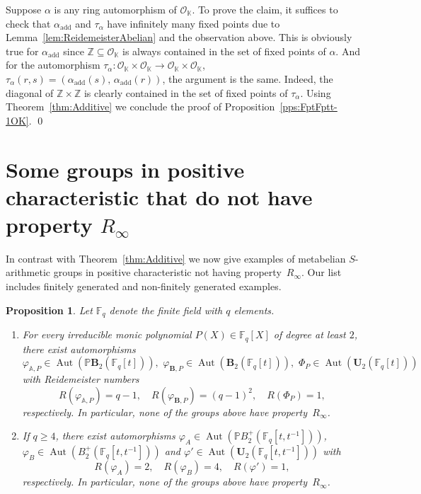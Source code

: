\documentclass[a4paper,11pt]{amsart}
\numberwithin{equation}{section}
\theoremstyle{plain}
\newtheorem{pps}[thm]{Proposition}
\theoremstyle{definition}
\newcommand{\Z}{\mathbb{Z}}
\newcommand{\K}{\mathbb{K}}
\newcommand{\F}{\mathbb{F}}
\newcommand{\addi}[1]{#1_{\text{add}}} %
\newcommand{\ri}{\mathcal{O}}
\newcommand{\mbU}{\mathbf{U}} %
\newcommand{\mbB}{\mathbf{B}} %
\newcommand{\PB}{\mathbb{P}\mathbf{B}} %
\newcommand{\PBplus}{\mathbb{P}B^{+}} %
\newcommand{\phee}{\varphi} %
\newcommand{\Ri}{R_{\infty}} %
\DeclareMathOperator{\Aut}{Aut}
\begin{document}
Suppose $\alpha$ is any ring automorphism of $\ri_\K$. To prove the claim, it suffices to check that $\addi{\alpha}$ and $\tau_\alpha$ have infinitely many fixed points due to Lemma~\ref{lem:ReidemeisterAbelian} and the observation above. This is obviously true for $\addi{\alpha}$ since $\Z \subseteq \ri_\K$ is always contained in the set of fixed points of $\alpha$. And for the automorphism $\tau_\alpha : \ri_\K \times \ri_\K \to \ri_\K \times \ri_\K$, $\tau_\alpha(r,s) = (\addi{\alpha}(s), \, \addi{\alpha}(r))$, the argument is the same. Indeed, the diagonal of $\Z \times \Z$ is clearly contained in the set of fixed points of $\tau_\alpha$. Using Theorem~\ref{thm:Additive} we conclude the proof of Proposition~\ref{pps:FptFptt-1OK}. \qed

\section{Some groups in positive characteristic that do not have property \texorpdfstring{$\Ri$}{R infinity}} \label{sec:newexampleswithoutRinfty}

In contrast with Theorem~\ref{thm:Additive} we now give examples of metabelian $S$-arithmetic groups in positive characteristic not having property~$\Ri$. Our list includes finitely generated and non-finitely generated examples.

\begin{pps}\label{nori} Let $\F_q$ denote the finite field with $q$ elements. 
\begin{enumerate}
	\item \label{nori.i} 
	For every irreducible monic polynomial $P(X) \in \F_q[X]$ of degree at least $2$, there exist automorphisms 
	\[\phee_{\mathbb{A},P} \in \Aut(\PB_2(\F_q[t])), \,\, \phee_{\mbB,P} \in \Aut(\mbB_2(\F_q[t])), \,\, \Phi_P \in \Aut(\mbU_2(\F_q[t]))\]
	with Reidemeister numbers 
    \[ R(\phee_{\mathbb{A},P}) = q-1, \quad R(\phee_{\mbB,P}) = (q-1)^2, \quad R(\Phi_P) = 1, \]
    respectively. In particular, 
	\emph{none} of the groups above have property~$\Ri$.  
	\item \label{nori.ii} 
	If $q \geq 4$, there exist automorphisms $\phee_{A} \in \Aut(\PBplus_2(\F_q[t,t^{-1}]))$, $\phee_{B} \in \Aut(B^+_2(\F_q[t,t^{-1}]))$ and $\phee' \in \Aut(\mbU_2(\F_q[t,t^{-1}]))$ 
	with 
    \[R(\phee_A) = 2, \quad R(\phee_B) = 4, \quad R(\phee') = 1,\] respectively. In particular, 
	\emph{none} of the groups above have property~$\Ri$.
\end{enumerate}
\end{pps} 
\end{document}
